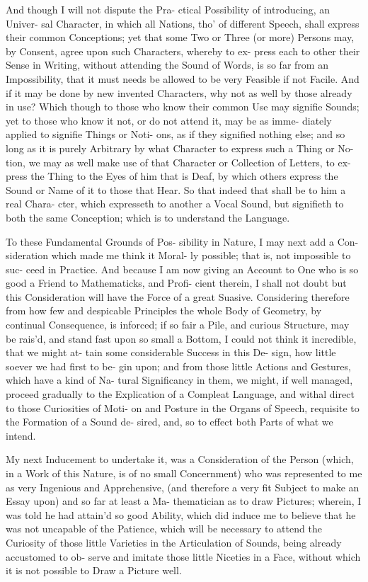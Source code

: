 And though I will not dispute the Pra-
ctical Possibility of introducing, an Univer-
sal Character, in which all Nations, tho'
of different Speech, shall express their
common Conceptions; yet that some Two
or Three (or more) Persons may, by Consent,
agree upon such Characters, whereby to ex-
press each to other their Sense in Writing,
without attending the Sound of Words, is
so far from an Impossibility, that it must
needs be allowed to be very Feasible if
not Facile. And if it may be done by new
invented Characters, why not as well by
those already in use? Which though to
those who know their common Use may
signifie Sounds; yet to those who know it
not, or do not attend it, may be as imme-
diately applied to signifie Things or Noti-
ons, as if they signified nothing else; and
so long as it is purely Arbitrary by what
Character to express such a Thing or No-
tion, we may as well make use of that
Character or Collection of Letters, to ex-
press the Thing to the Eyes of him that is
Deaf, by which others express the Sound
or Name of it to those that Hear. So that
indeed that shall be to him a real Chara-
cter, which expresseth to another a Vocal
Sound, but signifieth to both the same
Conception; which is to understand the
Language.

To these Fundamental Grounds of Pos-
sibility in Nature, I may next add a Con-
sideration which made me think it Moral-
ly possible; that is, not impossible to suc-
ceed in Practice. And because I am now
giving an Account to One who is so good
a Friend to Mathematicks, and Profi-
cient therein, I shall not doubt but this
Consideration will have the Force of a
great Suasive. Considering therefore from
how few and despicable Principles the
whole Body of Geometry, by continual
Consequence, is inforced; if so fair a Pile,
and curious Structure, may be rais'd, and
stand fast upon so small a Bottom, I could
not think it incredible, that we might at-
tain some considerable Success in this De-
sign, how little soever we had first to be-
gin upon; and from those little Actions
and Gestures, which have a kind of Na-
tural Significancy in them, we might, if
well managed, proceed gradually to the
Explication of a Compleat Language, and
withal direct to those Curiosities of Moti-
on and Posture in the Organs of Speech,
requisite to the Formation of a Sound de-
sired, and, so to effect both Parts of what
we intend.

My next Inducement to undertake it,
was a Consideration of the Person (which,
in a Work of this Nature, is of no small
Concernment) who was represented to
me as very Ingenious and Apprehensive,
(and therefore a very fit Subject to make
an Essay upon) and so far at least a Ma-
thematician as to draw Pictures; wherein,
I was told he had attain'd so good Ability,
which did induce me to believe that he
was not uncapable of the Patience, which
will be necessary to attend the Curiosity of
those little Varieties in the Articulation of
Sounds, being already accustomed to ob-
serve and imitate those little Niceties in
a Face, without which it is not possible to
Draw a Picture well.


